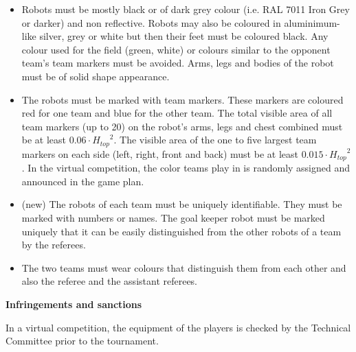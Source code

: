 \begin{itemize}
\item {}Robots must be mostly black or of dark grey colour (i.e.
  RAL 7011 Iron Grey or darker) and non reflective. Robots may also be coloured
  in aluminimum-like silver, grey or white but then their feet must be coloured
  black. Any colour used for the field (green, white) or colours similar to the
  opponent team's team markers must be avoided. Arms, legs and bodies of the
  robot must be of solid shape appearance.
\item {}The robots must be marked with team markers.
      These markers are coloured red for one team and blue for the other team.
      The total visible area of all team markers (up to 20) on the robot's arms,
      legs and chest combined must be at least $0.06\cdot {H_{top}}^2$.
      The visible area of the one to five largest team markers on each side
      (left, right, front and back) must be at least $0.015\cdot {H_{top}}^2$.
      In the virtual competition, the color teams play in is randomly assigned and announced in the game plan.

\item (new) The robots of each team must be uniquely identifiable. They must be marked with numbers or names. The goal keeper robot must be marked uniquely that it can be easily distinguished from the other robots of a team by the referees.
\item The two teams must wear colours that distinguish them from each other and also the referee and the assistant referees.
\end{itemize}

\bigskip

{\bfseries Infringements and sanctions}

\headlinebox

In a virtual competition, the equipment of the players is checked by the Technical Committee prior to the tournament.

